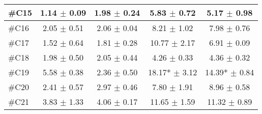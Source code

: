 \begin{longtable} {l|c|c|c|c}
\#C15 & 1.14 $\pm$ 0.09 & 1.98 $\pm$ 0.24  & 5.83 $\pm$ 0.72 & 5.17 $\pm$ 0.98 \\ \hline
\#C16 & 2.05 $\pm$ 0.51 & 2.06 $\pm$ 0.04  & 8.21 $\pm$ 1.02 & 7.98 $\pm$ 0.76 \\ \hline
\#C17 & 1.52 $\pm$ 0.64 & 1.81 $\pm$ 0.28  & 10.77 $\pm$ 2.17 & 6.91 $\pm$ 0.09 \\ \hline
\#C18 & 1.98  $\pm$ 0.50 & 2.05 $\pm$ 0.44 & 4.26  $\pm$ 0.33 &  4.36 $\pm$  0.32 \\ \hline
\#C19 & 5.58  $\pm$ 0.38 & 2.36 $\pm$ 0.50 & 18.17* $\pm$ 3.12 & 14.39* $\pm$ 0.84 \\ \hline
\#C20 & 2.41 $\pm$  0.57 & 2.97 $\pm$ 0.46  & 7.80 $\pm$ 1.91  &  8.96 $\pm$ 0.58 \\ \hline
\#C21 & 3.83 $\pm$ 1.33 & 4.06 $\pm$  0.17 & 11.65 $\pm$ 1.59  & 11.32 $\pm$ 0.89 \\ \hline
\end{longtable}